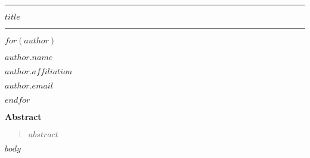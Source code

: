 \documentclass[10pt]{article}
\begin{document}
\noindent\rule{\textwidth}{5pt}

\begin{center}
{\fontsize{17}{19}\selectfont\bfseries $title$\par}
\end{center}

\noindent\rule{\textwidth}{1pt}

$for(author)$
\begin{center}
{\large\bfseries $author.name$\par}
{\normalsize $author.affiliation$\par}
{\normalsize\ttfamily $author.email$}
\vspace{0.7em}
\end{center}
$endfor$

\vspace{0.5em}
{\begin{center}\large\bfseries Abstract\end{center}}

\begin{quotation}
{\selectfont $abstract$}
\end{quotation}

$body$
\end{document}
